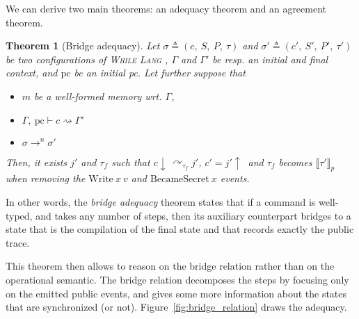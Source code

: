 \documentclass[10pt]{article}
\newcommand{\pc}{\mathrm{pc}}
\newcommand{\ctx}{\Gamma}
\newcommand{\conf}{\sigma}
\newcommand{\typing}[4]{ #1,~#2 \vdash #3 \rightsquigarrow #4}
\newcommand{\execn}[3] { #1 \rightarrow^{#2} #3 }
\newcommand{\bridge}[3] { #1 \curvearrowright_{#2} #3 }
\newcommand{\whilelang}{\textsc{While Lang} }
\newcommand{\pproj}[1]{\llbracket #1 \rrbracket_{p}}
\newcommand{\compile}[1]{#1\!\downarrow\ }
\newcommand{\uncompile}[1]{#1\!\uparrow\ }
\newtheorem{theorem}{Theorem}
\begin{document}

We can derive two main theorems: an adequacy theorem and an agreement theorem.
\begin{theorem}[Bridge adequacy]\label{thm:adequacy}
  Let $\conf \triangleq (c,~S,~P,~\tau)$ and $\conf' \triangleq (c',~S',~P',~\tau')$ be two
  configurations of \whilelang, $\ctx$ and $\ctx'$ be resp. an initial and final context,
  and $\pc$ be an initial pc.
  Let further suppose that

 \begin{itemize}
   \item $m$ be a well-formed memory wrt. $\ctx$,
   \item \(\typing{\ctx}{\pc}{c}{\ctx'} \)
   \item \( \execn{\conf}{n}{\conf'} \)
 \end{itemize}

  Then, it exists $j'$ and $\tau_{f}$ such that \( \bridge{\compile{c}}{\tau_{f}}{j'} \), $c' = \uncompile{j'}$ and \( \tau_f \) becomes \( \pproj{\tau'} \) when removing the \( \mathrm{Write}~x~v \) and \( \mathrm{BecameSecret}~x \) events.
\end{theorem}

In other words, the \emph{bridge adequacy} theorem states that if a command is well-typed, and takes
any number of steps, then its auxiliary counterpart bridges to a state that is the compilation of
the final state and that records exactly the public trace.

This theorem then allows to reason on the bridge relation rather than on the operational semantic.
The bridge relation decomposes the steps by focusing only on the emitted public events, and gives
some more information about the states that are synchronized (or not).
Figure~\ref{fig:bridge_relation} draws the adequacy.


\end{document}
